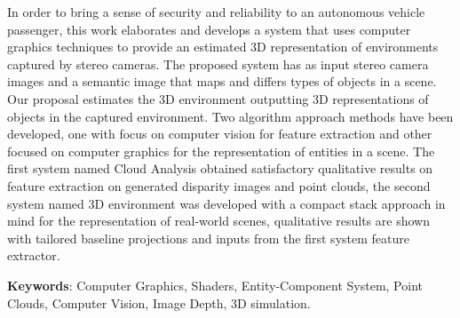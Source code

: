 \setlength{\absparsep}{18pt} %
\begin{resumo}

In order to bring a sense of security and reliability to an autonomous vehicle passenger, this work elaborates and develops a system that uses computer graphics techniques to provide an estimated 3D representation of environments captured by stereo cameras. The proposed system has as input stereo camera images and a semantic image that maps and differs types of objects in a scene. Our proposal estimates the 3D environment outputting 3D representations of objects in the captured environment. Two algorithm approach methods have been developed, one with focus on computer vision for feature extraction and other focused on computer graphics for the representation of entities in a scene. The first system named Cloud Analysis obtained satisfactory qualitative results on feature extraction on generated disparity images and point clouds, the second system named 3D environment was developed with a compact stack approach in mind for the representation of real-world scenes, qualitative results are shown with tailored baseline projections and inputs from the first system feature extractor.

\noindent\textbf{Keywords}: Computer Graphics, Shaders, Entity-Component System, Point Clouds, Computer Vision, Image Depth, 3D simulation.

\end{resumo}
